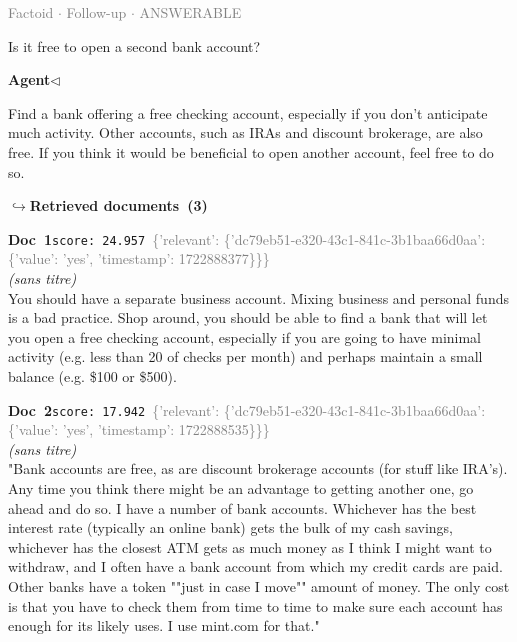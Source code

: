 \documentclass[a4paper,11pt]{article}
\begin{document}
\vspace{0.5em}
\hfill{\tiny\textcolor{gray}{Factoid $\cdot$ Follow-up $\cdot$ ANSWERABLE}}
\begin{userbubble}
Is it free to open a second bank account?
\end{userbubble}
\noindent\hfill{\small\textcolor{agentcolor}{\textbf{Agent\enspace$\triangleleft$}}}
\begin{agentbubble}
Find a bank offering a free checking account, especially if you don't anticipate much activity. Other accounts, such as IRAs and discount brokerage, are also free. If you think it would be beneficial to open another account, feel free to do so.
\end{agentbubble}
\noindent\hfill{\footnotesize\textcolor{doccolor}{\textbf{$\hookrightarrow$\enspace Retrieved documents~(3)}}}
\begin{docenv}
{\footnotesize\textcolor{doccolor}{\textbf{Doc~1}}}\hfill{\tiny\texttt{score:~24.957}}\ {\tiny\textcolor{gray}{\{'relevant': \{'dc79eb51-e320-43c1-841c-3b1baa66d0aa': \{'value': 'yes', 'timestamp': 1722888377\}\}\}}}\\[3pt]
{\small\textit{(sans titre)}}\\[2pt]
\vspace{2pt}
{\footnotesize 
You should have a separate business account. Mixing business and personal funds is a bad practice. Shop around, you should be able to find a bank that will let you open a free checking account, especially if you are going to have minimal activity (e.g. less than 20 of checks per month) and perhaps maintain a small balance (e.g. \$100 or \$500).}
\end{docenv}
\begin{docenv}
{\footnotesize\textcolor{doccolor}{\textbf{Doc~2}}}\hfill{\tiny\texttt{score:~17.942}}\ {\tiny\textcolor{gray}{\{'relevant': \{'dc79eb51-e320-43c1-841c-3b1baa66d0aa': \{'value': 'yes', 'timestamp': 1722888535\}\}\}}}\\[3pt]
{\small\textit{(sans titre)}}\\[2pt]
\vspace{2pt}
{\footnotesize 
"Bank accounts are free, as are discount brokerage accounts (for stuff like IRA's).  Any time you think there might be an advantage to getting another one, go ahead and do so. I have a number of bank accounts.  Whichever has the best interest rate (typically an online bank) gets the bulk of my cash savings, whichever has the closest ATM gets as much money as I think I might want to withdraw, and I often have a bank account from which my credit cards are paid. Other banks have a token ""just in case I move"" amount of money. The only cost is that you have to check them from time to time to make sure each account has enough for its likely uses.  I use mint.com for that."}
\end{docenv}
\end{document}
